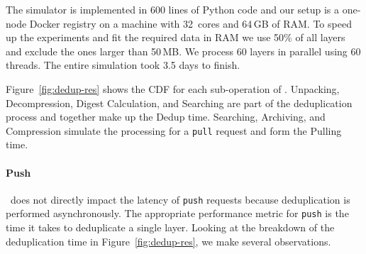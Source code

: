 The simulator is implemented in 600 lines of Python code
and our setup is a one-node Docker registry on a machine with 32~cores and 64\,GB of RAM.
%
To speed up the experiments and fit the required data in RAM
we use 50\% of all layers and exclude the ones larger than 50\,MB.
%
We process 60 layers in parallel using 60 threads.
%
The entire simulation took 3.5 days to finish.
%

Figure~\ref{fig:dedup-res} shows the CDF for each sub-operation of
\sysname.
%
Unpacking, Decompression, Digest Calculation, and Searching 
are part of
the deduplication process and together make up the Dedup time.
%
%
Searching, Archiving, and Compression
simulate the processing for a \texttt{pull}
request and form the Pulling time.
%

%
%
%
%

\paragraph{Push}

\sysname\ does not directly impact the latency of \texttt{push} requests because
deduplication is performed asynchronously.
%
The appropriate performance metric for \texttt{push} is the time it takes to deduplicate
a single layer.
%
%
%
Looking at the breakdown of the deduplication time in
Figure~\ref{fig:dedup-res}, we make several observations.

